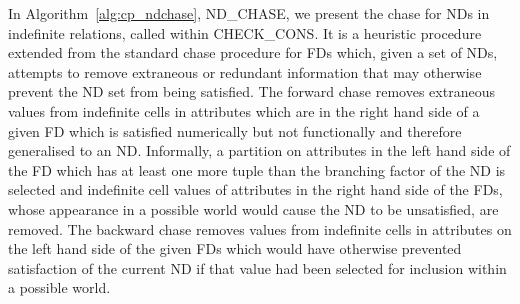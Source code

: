 In Algorithm~\ref{alg:cp_ndchase}, ND\_CHASE, we present the chase for
NDs in indefinite relations,  
called within CHECK\_CONS. It is a heuristic procedure extended from the
standard chase procedure for FDs \cite{bv84,Mann92} which, given a set
of NDs, attempts to remove extraneous or redundant information that 
may otherwise prevent the ND set from being satisfied. The forward chase
removes extraneous values 
from indefinite cells in attributes which are in the right hand
side of a given FD which is satisfied numerically but not functionally and 
therefore generalised to an ND.  Informally, a partition on attributes
in the left
hand side of the FD which has at least one more tuple than the
branching factor of the
ND is selected 
and indefinite cell values of attributes in the right hand side of the
FDs, whose appearance in a possible world would cause the ND to
be unsatisfied, are removed. The backward chase removes values from
indefinite cells in attributes on the left hand side of the given
FDs which would have otherwise prevented satisfaction of the current
ND if that value had been selected for inclusion within a possible world.



